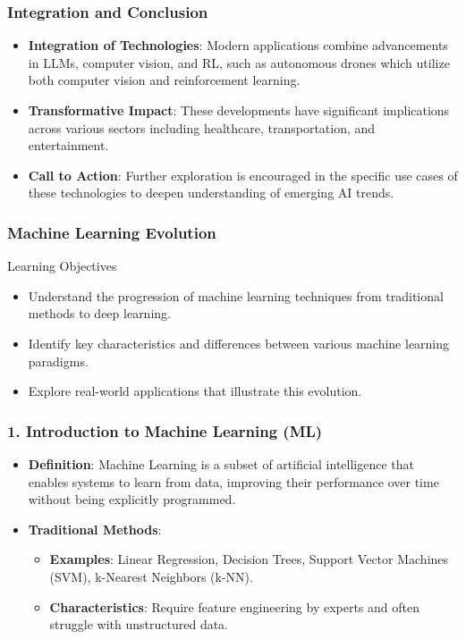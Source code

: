 \documentclass[aspectratio=169]{beamer}
\begin{document}
\begin{frame}[fragile]
    \frametitle{Integration and Conclusion}
    \begin{itemize}
        \item \textbf{Integration of Technologies}: Modern applications combine advancements in LLMs, computer vision, and RL, such as autonomous drones which utilize both computer vision and reinforcement learning.
        \item \textbf{Transformative Impact}: These developments have significant implications across various sectors including healthcare, transportation, and entertainment.
        \item \textbf{Call to Action}: Further exploration is encouraged in the specific use cases of these technologies to deepen understanding of emerging AI trends.
    \end{itemize}
\end{frame}

\begin{frame}
    \frametitle{Machine Learning Evolution}
    \begin{block}{Learning Objectives}
        \begin{itemize}
            \item Understand the progression of machine learning techniques from traditional methods to deep learning.
            \item Identify key characteristics and differences between various machine learning paradigms.
            \item Explore real-world applications that illustrate this evolution.
        \end{itemize}
    \end{block}
\end{frame}

\begin{frame}
    \frametitle{1. Introduction to Machine Learning (ML)}
    \begin{itemize}
        \item \textbf{Definition}: Machine Learning is a subset of artificial intelligence that enables systems to learn from data, improving their performance over time without being explicitly programmed.
        \item \textbf{Traditional Methods}: 
        \begin{itemize}
            \item \textbf{Examples}: Linear Regression, Decision Trees, Support Vector Machines (SVM), k-Nearest Neighbors (k-NN).
            \item \textbf{Characteristics}: Require feature engineering by experts and often struggle with unstructured data.
        \end{itemize}
    \end{itemize}
\end{frame}
\end{document}
